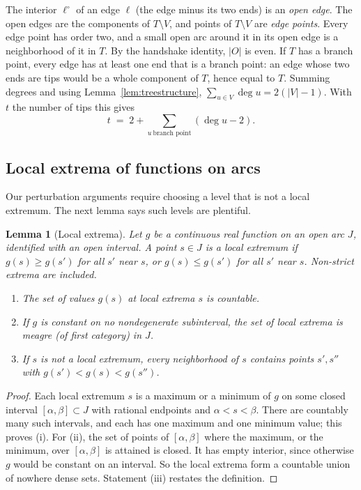 \documentclass[11pt]{amsart}
\newtheorem{lemma}[theorem]{Lemma}
\theoremstyle{definition}
\theoremstyle{remark}
\newcommand{\Odd}{O}
\newcommand{\Ver}{V}
\begin{document}
The interior $\ell^\circ$ of an edge $\ell$ (the edge minus its two ends) is an \emph{open edge}. The open edges are the components of $T\setminus\Ver$, and points of $T\setminus\Ver$ are \emph{edge points}. Every edge point has order two, and a small open arc around it in its open edge is a neighborhood of it in $T$. By the handshake identity, $|\Odd|$ is even. If $T$ has a branch point, every edge has at least one end that is a branch point: an edge whose two ends are tips would be a whole component of $T$, hence equal to $T$. Summing degrees and using Lemma~\ref{lem:treestructure}, $\sum_{u\in\Ver}\deg u=2(|\Ver|-1)$. With $t$ the number of tips this gives
\begin{equation}\label{eq:tips}
  t \;=\; 2+\sum_{u\ \text{branch point}}(\deg u-2).
\end{equation}

\subsection{Local extrema of functions on arcs}
Our perturbation arguments require choosing a level that is not a local extremum. The next lemma says such levels are plentiful.

\begin{lemma}[Local extrema]\label{lem:extrema}
Let $g$ be a continuous real function on an open arc $J$, identified with an open interval. A point $s\in J$ is a \emph{local extremum} if $g(s)\ge g(s')$ for all $s'$ near $s$, or $g(s)\le g(s')$ for all $s'$ near $s$. Non-strict extrema are included.
\begin{enumerate}[label=\textup{(\roman*)}]
\item The set of values $g(s)$ at local extrema $s$ is countable.
\item If $g$ is constant on no nondegenerate subinterval, the set of local extrema is meagre (of first category) in $J$.
\item If $s$ is not a local extremum, every neighborhood of $s$ contains points $s',s''$ with $g(s')<g(s)<g(s'')$.
\end{enumerate}
\end{lemma}
\begin{proof}
Each local extremum $s$ is a maximum or a minimum of $g$ on some closed interval $[\alpha,\beta]\subset J$ with rational endpoints and $\alpha<s<\beta$. There are countably many such intervals, and each has one maximum and one minimum value; this proves (i). For (ii), the set of points of $[\alpha,\beta]$ where the maximum, or the minimum, over $[\alpha,\beta]$ is attained is closed. It has empty interior, since otherwise $g$ would be constant on an interval. So the local extrema form a countable union of nowhere dense sets. Statement (iii) restates the definition.
\end{proof}
\end{document}
